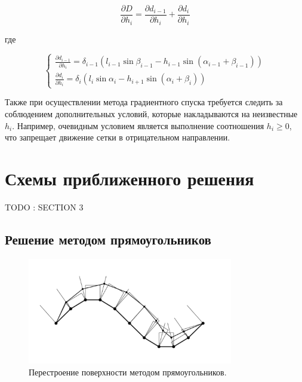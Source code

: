 \documentclass[
11pt,%
tightenlines,%
twoside,%
onecolumn,%
nofloats,%
nobibnotes,%
nofootinbib,%
superscriptaddress,%
noshowpacs,%
centertags]%
{revtex4}
\begin{document}
\begin{equation}
\frac{\partial D}{\partial h_i} = \frac{\partial d_{i - 1}}{\partial h_i} + \frac{\partial d_i}{\partial h_i}
\end{equation}

где

\begin{equation}
\begin{cases}
\frac{\partial d_{i - 1}}{\partial h_i} = \delta_{i - 1}(l_{i - 1} \sin \beta_{i - 1} - h_{i - 1} \sin(\alpha_{i - 1} + \beta_{i - 1})) \\
\frac{\partial d_i}{\partial h_i} = \delta_i(l_i \sin \alpha_i - h_{i + 1} \sin(\alpha_i + \beta_i))
\end{cases}
\end{equation}

Также при осуществлении метода градиентного спуска требуется следить за соблюдением дополнительных условий, которые накладываются на неизвестные $h_i$.
Например, очевидным условием является выполнение соотношения $h_i \ge 0$, что запрещает движение сетки в отрицательном направлении.

\section{Схемы приближенного решения}

TODO : SECTION 3

\subsection{Решение методом прямоугольников}

\begin{figure}[h]
\setcaptionmargin{5mm}
\onelinecaptionstrue
\includegraphics[width=0.8\textwidth]{pics/grid_rectangles.pdf}
\caption{Перестроение поверхности методом прямоугольников.}
\label{fig:grid_rectangles}
\end{figure}
\end{document}
